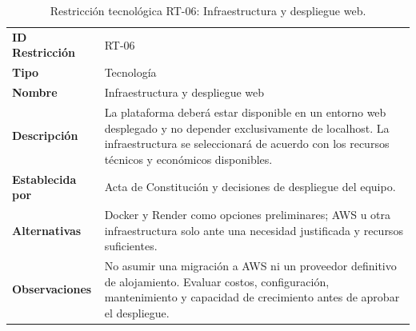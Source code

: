 \documentclass[11pt,a4paper,oneside]{article}
\begin{document}
\begingroup
\small
\setlength{\tabcolsep}{7pt}
\renewcommand{\arraystretch}{1.30}
\setlength{\anchoRegistro}{\dimexpr\textwidth-4\tabcolsep-3\arrayrulewidth\relax}
\begin{table}[H]
\centering
\caption{Restricción tecnológica RT-06: Infraestructura y despliegue web.}
\label{tab:restriccion-rt-06}
\begin{tabular}{|
>{\RaggedRight\arraybackslash}p{.28\anchoRegistro}|
>{\RaggedRight\arraybackslash}p{.72\anchoRegistro}|}
\hline
\rowcolor{negroTabla}
\multicolumn{2}{|l|}{\color{white}\bfseries Registro de Restricción Tecnológica}\\\hline
\cellcolor{azulTabla}\bfseries ID Restricción
& RT-06\\\hline
\cellcolor{azulTabla}\bfseries Tipo
& Tecnología\\\hline
\cellcolor{azulTabla}\bfseries Nombre
& Infraestructura y despliegue web\\\hline
\cellcolor{azulTabla}\bfseries Descripción
& La plataforma deberá estar disponible en un entorno web desplegado y no depender exclusivamente de localhost. La infraestructura se seleccionará de acuerdo con los recursos técnicos y económicos disponibles.\\\hline
\cellcolor{azulTabla}\bfseries Establecida por
& Acta de Constitución y decisiones de despliegue del equipo.\\\hline
\cellcolor{azulTabla}\bfseries Alternativas
& Docker y Render como opciones preliminares; AWS u otra infraestructura solo ante una necesidad justificada y recursos suficientes.\\\hline
\cellcolor{azulTabla}\bfseries Observaciones
& No asumir una migración a AWS ni un proveedor definitivo de alojamiento. Evaluar costos, configuración, mantenimiento y capacidad de crecimiento antes de aprobar el despliegue.\\\hline
\end{tabular}
\end{table}
\endgroup
\end{document}
